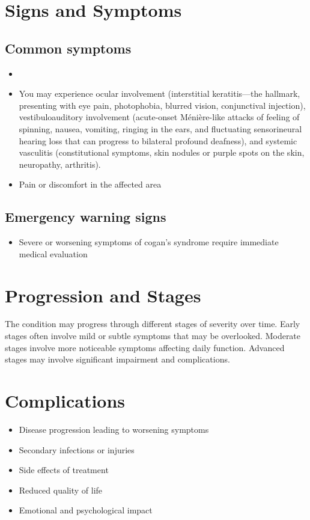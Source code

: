 \section{Signs and Symptoms}

\subsection{Common symptoms}
\begin{itemize}[noitemsep]
  \item \item You may experience ocular involvement (interstitial keratitis---the hallmark, presenting with eye pain, photophobia, blurred vision, conjunctival injection), vestibuloauditory involvement (acute-onset Ménière-like attacks of feeling of spinning, nausea, vomiting, ringing in the ears, and fluctuating sensorineural hearing loss that can progress to bilateral profound deafness), and systemic vasculitis (constitutional symptoms, skin nodules or purple spots on the skin, neuropathy, arthritis).

  \item Pain or discomfort in the affected area
  \end{itemize}

\subsection{Emergency warning signs}
\begin{itemize}[noitemsep]
  \item Severe or worsening symptoms of cogan's syndrome require immediate medical evaluation
\end{itemize}
\section{Progression and Stages}
The condition may progress through different stages of severity over time. Early stages often involve mild or subtle symptoms that may be overlooked. Moderate stages involve more noticeable symptoms affecting daily function. Advanced stages may involve significant impairment and complications.
\section{Complications}
\begin{itemize}[noitemsep]
  \item Disease progression leading to worsening symptoms
  \item Secondary infections or injuries
  \item Side effects of treatment
  \item Reduced quality of life
  \item Emotional and psychological impact
\end{itemize}
